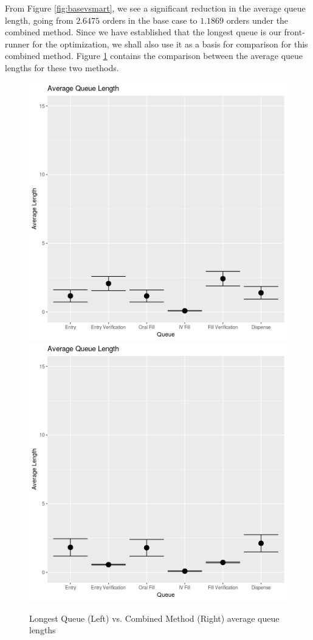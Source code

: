 \documentclass[10pt]{report}            %
\begin{document}
From Figure \ref{fig:basevsmart}, we see a significant reduction in the average queue length, going from $2.6475$ orders in the base case to $1.1869$ orders  under the combined method. Since we have established that the longest queue is our front-runner for the optimization, we shall also use it as a basis for comparison for this combined method. Figure \ref{fig:longvsmart} contains the comparison between the average queue lengths for these two methods.
\begin{figure}[H]
\centering
\includegraphics[scale=.35]{LongestQueueCIs.png}
\includegraphics[scale=.35]{SmartQueueCIs.png}
\caption{Longest Queue (Left) vs. Combined Method (Right) average queue lengths}
\label{fig:longvsmart}
\end{figure}
\end{document}
